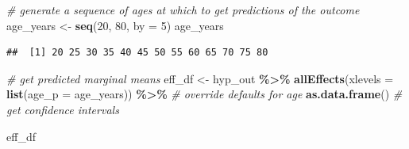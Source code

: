 \documentclass[
]{book}
\newenvironment{Shaded}{\begin{snugshade}}{\end{snugshade}}
\newcommand{\CommentTok}[1]{\textcolor[rgb]{0.56,0.35,0.01}{\textit{#1}}}
\newcommand{\DataTypeTok}[1]{\textcolor[rgb]{0.13,0.29,0.53}{#1}}
\newcommand{\DecValTok}[1]{\textcolor[rgb]{0.00,0.00,0.81}{#1}}
\newcommand{\KeywordTok}[1]{\textcolor[rgb]{0.13,0.29,0.53}{\textbf{#1}}}
\newcommand{\NormalTok}[1]{#1}
\newcommand{\OperatorTok}[1]{\textcolor[rgb]{0.81,0.36,0.00}{\textbf{#1}}}
\newcommand{\StringTok}[1]{\textcolor[rgb]{0.31,0.60,0.02}{#1}}
\begin{document}
\begin{Shaded}
\begin{Highlighting}[]
  \CommentTok{\# generate a sequence of ages at which to get predictions of the outcome}
\NormalTok{  age\_years \textless{}{-}}\StringTok{ }\KeywordTok{seq}\NormalTok{(}\DecValTok{20}\NormalTok{, }\DecValTok{80}\NormalTok{, }\DataTypeTok{by =} \DecValTok{5}\NormalTok{)}
\NormalTok{  age\_years}
\end{Highlighting}
\end{Shaded}

\begin{verbatim}
##  [1] 20 25 30 35 40 45 50 55 60 65 70 75 80
\end{verbatim}

\begin{Shaded}
\begin{Highlighting}[]
  \CommentTok{\# get predicted marginal means}
\NormalTok{  eff\_df \textless{}{-}}\StringTok{ }
\StringTok{      }\NormalTok{hyp\_out }\OperatorTok{\%\textgreater{}\%}\StringTok{ }
\StringTok{      }\KeywordTok{allEffects}\NormalTok{(}\DataTypeTok{xlevels =} \KeywordTok{list}\NormalTok{(}\DataTypeTok{age\_p =}\NormalTok{ age\_years)) }\OperatorTok{\%\textgreater{}\%}\StringTok{ }\CommentTok{\# override defaults for age}
\StringTok{      }\KeywordTok{as.data.frame}\NormalTok{() }\CommentTok{\# get confidence intervals}
  
\NormalTok{  eff\_df}
\end{Highlighting}
\end{Shaded}
\end{document}
